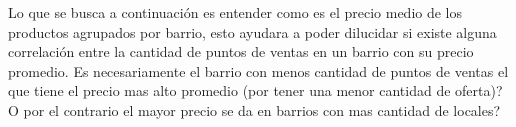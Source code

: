 Lo que se busca a continuación es entender como es el precio medio de los productos agrupados por barrio, esto ayudara a poder dilucidar si existe alguna correlación entre la cantidad de puntos de ventas en un barrio con su precio promedio.
Es necesariamente el barrio con menos cantidad de puntos de ventas el que tiene el precio mas alto promedio (por tener una menor cantidad de oferta)?\\
O por el contrario el mayor precio se da en barrios con mas cantidad de locales?


\begin{figure}[H]
\end{figure}

